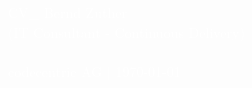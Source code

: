 \newcommand{\cccvname}{Bernd Zuther}
\newcommand{\cccvjobtitle}{IT Consultant - Continuous Delivery}

\NoBgThispage
\AddToShipoutPicture*{\BackgroundPic}
\vspace*{18.5cm}
\noindent
\textcolor{white}{
{\Huge CV\_ \cccvname}\\[8pt]
{\huge (\cccvjobtitle)}\\
\\[8pt]
{\Large codecentric AG | \today}
}

